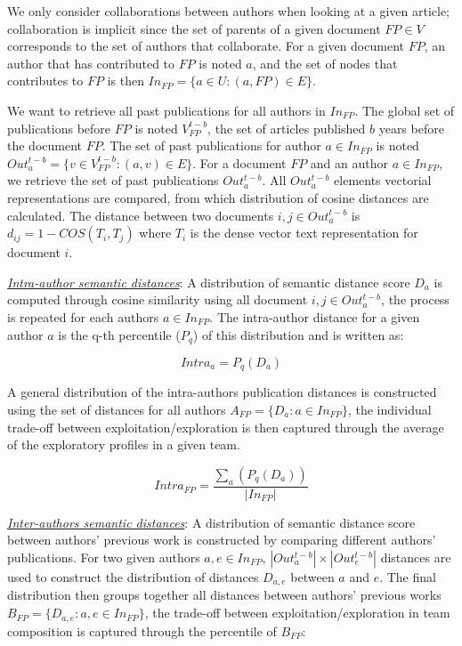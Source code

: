     
        We only consider collaborations between authors when looking at a given article; collaboration is implicit since the set of parents of a given document $FP \in V$ corresponds to the set of authors that collaborate. For a given document $FP$, an author that has contributed to $FP$ is noted $a$, and the set of nodes that contributes to $FP$ is then $In_{FP} = \{a\in U : (a,FP) \in E\}$. 
        
        We want to retrieve all past publications for all authors in $In_{FP}$. The global set of publications before $FP$ is noted $V^{t-b}_{FP}$, the set of articles published $b$ years before the document $FP$. The set of past publications for author $a \in In_{FP}$ is noted $Out^{t-b}_a = \{v \in V^{t-b}_{FP} : (a,v) \in E \}$. For a document $FP$ and an author $a \in In_{FP}$, we retrieve the set of past publications $Out^{t-b}_a$. All $Out_a^{t-b}$ elements vectorial representations are compared, from which distribution of cosine distances are calculated. The distance between two documents $i, j \in Out^{t-b}_a$ is $d_{ij} = 1-COS(T_i,T_j)$ where $T_i$ is the dense vector text representation for document $i$.


        \vspace{0.5cm}
        \textit{\underline{Intra-author semantic distances}}: A distribution of semantic distance score $D_a$ is computed through cosine similarity using all document  $i, j \in Out_a^{t-b}$, the process is repeated for each authors $a \in In_{FP}$. The intra-author distance for a given author $a$ is the q-th percentile ($P_q$) of this distribution and is written as:
        
        $$Intra_{a} = P_{q}(D_a)$$
        
        A general distribution of the intra-authors publication distances is constructed using the set of distances for all authors $A_{FP} = \{D_a: a \in In_{FP}\}$, the individual trade-off between exploitation/exploration is then captured through the average of the exploratory profiles in a given team.
        
        $$Intra_{FP} = \frac{\sum_a (P_{q}(D_a))}{|In_{FP}|}$$
        
            
        
        \vspace{0.5cm}
        \textit{\underline{Inter-authors semantic distances}}: A distribution of semantic distance score between authors' previous work is constructed by comparing different authors' publications. For two given authors $a, e \in In_{FP}$, $|Out_a^{t-b}|\times|Out_e^{t-b}|$ distances are used to construct the distribution of distances $D_{a,e}$ between $a$ and $e$. The final distribution then groups together all distances between authors' previous works $B_{FP} = \{D_{a,e}: a, e \in In_{FP}\}$, the trade-off between exploitation/exploration in team composition is captured through the percentile of $B_{FP}$:
        
